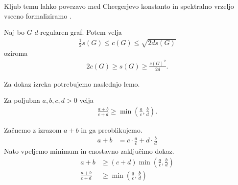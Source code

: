 Kljub temu lahko povezavo med Cheegerjevo konstanto in spektralno vrzeljo vseeno formaliziramo \cite{chung-cheeger}.
\begin{izrek}\label{cheeger-neenakost}
    Naj bo \(G\) \(d\)-regularen graf. Potem velja 
    \begin{align*}
        \frac{1}{2}s(G) \leq c(G) \leq \sqrt{2ds(G)}
    \end{align*}
    oziroma
    \begin{align*}
        2c(G) \geq s(G) \geq \frac{c(G)^2}{2d}.
    \end{align*} 
\end{izrek}
Za dokaz izreka potrebujemo naslednjo lemo.
\begin{lema}\label{cheegerLema}
    Za poljubna \(a, b, c, d > 0\) velja
    \begin{align*}
        \frac{a+b}{c+d} \geq \min\left(\frac{a}{c}, \frac{b}{d}\right).
    \end{align*}
\end{lema}
\begin{dokaz}
    Začnemo z izrazom \(a+b\) in ga preoblikujemo.
    \begin{align*}
        a+b &= c\cdot\frac{a}{c} + d\cdot \frac{b}{d}
    \end{align*}
    Nato vpeljemo minimum in enostavno zaključimo dokaz.
    \begin{align*}
        a+b &\geq (c+d) \min\left(\frac{a}{c}, \frac{b}{d}\right)\\
        \frac{a+b}{c+d} &\geq \min\left(\frac{a}{c}, \frac{b}{d}\right)
    \end{align*}
\end{dokaz}
